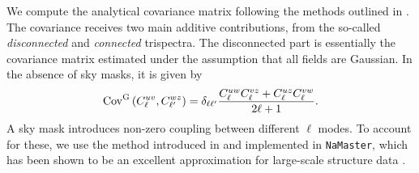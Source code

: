 \documentclass[useAMS,usenatbib]{mn2e}
\begin{document}
    We compute the analytical covariance matrix following the methods outlined in \cite{2017MNRAS.470.2100K}. The covariance receives two main additive contributions, from the so-called {\sl disconnected} and {\sl connected} trispectra. The disconnected part is essentially the covariance matrix estimated under the assumption that all fields are Gaussian. In the absence of sky masks, it is given by
    \begin{equation}
      {\rm Cov}^{\rm G}\left(C^{uv}_\ell,C^{wz}_{\ell'}\right)=\delta_{\ell\ell'}\frac{C^{uw}_\ell C^{vz}_\ell+C^{uz}_\ell C^{vw}_\ell}{2\ell+1}.
    \end{equation}
    A sky mask introduces non-zero coupling between different $\ell$ modes. To account for these, we use the  method introduced in \cite{2004MNRAS.349..603E} and implemented in {\tt NaMaster}, which has been shown to be an excellent approximation for large-scale structure data \citep{2019arXiv190611765G}.
\end{document}
